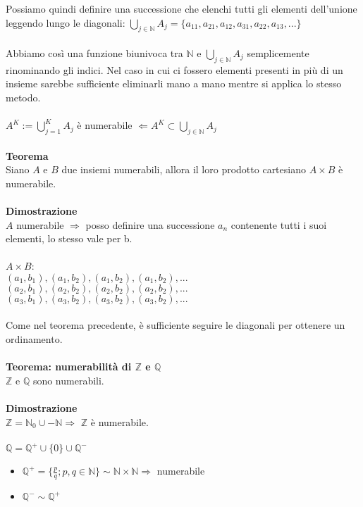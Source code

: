 \documentclass{article}
\begin{document}
Possiamo quindi definire una successione che elenchi tutti gli elementi dell'unione leggendo lungo le diagonali: $\bigcup_{j \in \mathds{N}} A_j = \{a_{11}, a_{21}, a_{12}, a_{31}, a_{22}, a_{13}, ...\}$\\\\
Abbiamo così una funzione biunivoca tra $\mathds{N}$ e $\bigcup_{j \in \mathds{N}} A_j$ semplicemente rinominando gli indici. Nel caso in cui ci fossero elementi presenti in più di un insieme sarebbe sufficiente eliminarli mano a mano mentre si applica lo stesso metodo.\\\\
$A^K := \bigcup_{j=1} ^K A_j$ è numerabile $\Leftarrow A^K \subset \bigcup_{j \in \mathds{N}} A_j$\\
\\
\textbf{Teorema}\\
Siano $A$ e $B$ due insiemi numerabili, allora il loro prodotto cartesiano $A \times B$ è numerabile.\\\\
\textbf{Dimostrazione}\\
$A$ numerabile $\Rightarrow$ posso definire una successione ${a_n}$ contenente tutti i suoi elementi, lo stesso vale per b.\\\\
$A \times B$:\\
$(a_1,b_1), (a_1,b_2), (a_1,b_2), (a_1,b_2), ...$\\
$(a_2,b_1), (a_2,b_2), (a_2,b_2), (a_2,b_2), ...$\\
$(a_3,b_1), (a_3,b_2), (a_3,b_2), (a_3,b_2), ...$\\\\
Come nel teorema precedente, è sufficiente seguire le diagonali per ottenere un ordinamento.\\
\\
\textbf{Teorema: numerabilità di $\mathds{Z}$ e $\mathds{Q}$}\\
$\mathds{Z}$ e $\mathds{Q}$ sono numerabili.\\\\
\textbf{Dimostrazione}\\
$\mathds{Z} = \mathds{N}_0 \cup -\mathds{N} \Rightarrow$ $\mathds{Z}$ è numerabile.\\\\
$\mathds{Q} = \mathds{Q}^+ \cup \{0\} \cup \mathds{Q}^-$ \begin{itemize}
    \item $\mathds{Q}^+ = \{\frac{p}{q}; p,q \in \mathds{N} \} \sim \mathds{N} \times \mathds{N} \Rightarrow$ numerabile
    \item $\mathds{Q}^- \sim \mathds{Q}^+$
\end{itemize}
\end{document}
